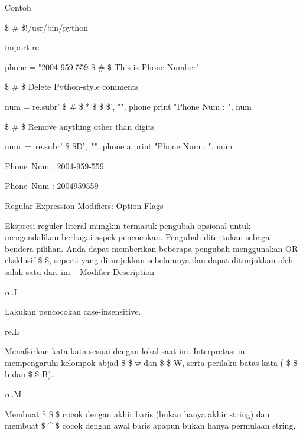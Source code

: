 \begin{12pt}
\begin{12pt}
\begin{12pt}
Contoh \par
\noindent 
 \$  \#  \$!/usr/bin/python \par
\noindent 
import re \par
\vspace{12pt}
\noindent 
phone = "2004-959-559  \$  \#  \$ This is Phone Number" \par
\vspace{12pt}
\noindent 
 \$  \#  \$ Delete Python-style comments \par
\noindent 
num = re.sub{r' \$  \#  \$.* \$  \$  \$', "", phone} 
\noindent 
print "Phone Num : ", num \par
\begin{12pt}
\item
 \$  \#  \$ Remove anything other than digits \par
\noindent 
num~=~re.sub{r' \$  \setminus  \$D',~"", phone}     a
\noindent 
print "Phone Num : ", num \par
\begin{12pt}
\noindent 
Phone~Num :  2004-959-559 \par
\noindent 
Phone~Num :  2004959559 \par
\vspace{12pt}
\noindent 
Regular Expression Modifiers: Option Flags \par
Ekspresi reguler literal mungkin termasuk pengubah opsional untuk mengendalikan berbagai aspek pencocokan. Pengubah ditentukan sebagai bendera pilihan. Anda dapat memberikan beberapa pengubah menggunakan OR eksklusif {\$  \vert  \$}, seperti yang ditunjukkan sebelumnya dan dapat ditunjukkan oleh salah satu dari ini – Modifier Description  \par
\noindent 
re.I \hspace*{0.5in}  \par
\noindent 
Lakukan pencocokan case-insensitive. \par
\vspace{12pt}
\noindent 
re.L \hspace*{0.5in}  \par
\noindent 
Menafsirkan kata-kata sesuai dengan lokal saat ini. Interpretasi ini mempengaruhi kelompok abjad { \$  \setminus \$ w dan  \$  \setminus  \$ W}, serta perilaku batas kata ( \$  \setminus  \$ b dan  \$  \setminus  \$ B). \par
\vspace{12pt}
\noindent 
re.M \hspace*{0.5in}  \par
\noindent 
Membuat  \$  \$  \$ cocok dengan akhir baris (bukan hanya akhir string) dan membuat  \$  \string^  \$ cocok dengan awal baris apapun {bukan hanya permulaan string}. \par

\end{12pt}
\end{12pt}
\end{12pt}
\end{12pt}
\end{12pt}
